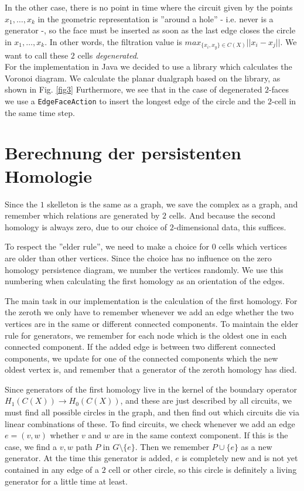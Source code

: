 \documentclass[11pt, a4paper,draft]{report}
\begin{document}
 	In the other case, there is no point in time where the circuit given by the points $x_1,\ldots,x_k$ in the geometric representation is ''around a hole'' - i.e. never is a generator -, so the face must be inserted as soon as the last edge closes the circle in $x_1,\ldots,x_k$. In other words, the filtration value is $max_{\{x_i,x_y\}\in C(X)}||x_i-x_j||$. We want to call these $2$ cells \textit{degenerated}.\\
For the implementation in Java we decided to use a library which calculates the Voronoi diagram. We calculate the planar dualgraph based on the library, as shown in Fig. \ref{fig3} Furthermore, we see that in the case of degenerated $2$-faces we use a \texttt{EdgeFaceAction} to insert the longest edge of the circle and the $2$-cell in the same time step.
 	
 	\section{Berechnung der persistenten Homologie}
 	
Since the $1$ skelleton is the same as a graph, we save the complex as a graph, and remember which relations are generated by $2$ cells. And because the second homology is always zero, due to our choice of $2$-dimensional data, this suffices.

To respect the ''elder rule'', we need to make a choice for $0$ cells which vertices are older than other vertices. Since the choice has no influence on the zero homology persistence diagram, we number the vertices randomly. We use this numbering when calculating the first homology as an orientation of the edges.

The main task in our implementation is the calculation of the first homology. For the zeroth we only have to remember whenever we add an edge whether the two vertices are in the same or different connected components. To maintain the elder rule for generators, we remember for each node which is the oldest one in each connected component. If the added edge is between two different connected components, we update for one of the connected components which the new oldest vertex is, and remember that a generator of the zeroth homology has died.

Since generators of the first homology live in the kernel of the boundary operator $H_1(C(X))\rightarrow H_0(C(X))$, and these are just described by all circuits, we must find all possible circles in the graph, and then find out which circuits die via linear combinations of these.
To find circuits, we check whenever we add an edge $e=(v,w)$ whether $v$ and $w$ are in the same context component. If this is the case, we find a $v,w$ path $P$ in $G\setminus \{e\}$. Then we remember $P\cup \{e\}$ as a new generator. At the time this generator is added, $e$ is completely new and is not yet contained in any edge of a $2$ cell or other circle, so this circle is definitely a living generator for a little time at least. 
\end{document}

